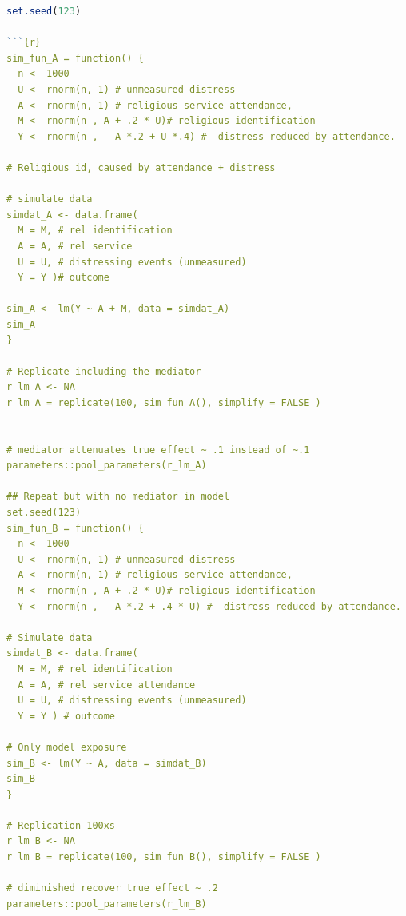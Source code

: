 \documentclass[]{interact}
\theoremstyle{plain}%
\theoremstyle{definition}
\theoremstyle{remark}
\begin{document}
\singlespace
\begin{lstlisting}[language=R]
set.seed(123)

```{r}
sim_fun_A = function() {
  n <- 1000
  U <- rnorm(n, 1) # unmeasured distress 
  A <- rnorm(n, 1) # religious service attendance,
  M <- rnorm(n , A + .2 * U)# religious identification
  Y <- rnorm(n , - A *.2 + U *.4) #  distress reduced by attendance.
  
# Religious id, caused by attendance + distress

# simulate data
simdat_A <- data.frame(
  M = M, # rel identification
  A = A, # rel service
  U = U, # distressing events (unmeasured)
  Y = Y )# outcome

sim_A <- lm(Y ~ A + M, data = simdat_A)
sim_A
}

# Replicate including the mediator
r_lm_A <- NA
r_lm_A = replicate(100, sim_fun_A(), simplify = FALSE )


# mediator attenuates true effect ~ .1 instead of ~.1
parameters::pool_parameters(r_lm_A)

## Repeat but with no mediator in model
set.seed(123)
sim_fun_B = function() {
  n <- 1000
  U <- rnorm(n, 1) # unmeasured distress 
  A <- rnorm(n, 1) # religious service attendance,
  M <- rnorm(n , A + .2 * U)# religious identification
  Y <- rnorm(n , - A *.2 + .4 * U) #  distress reduced by attendance.
  
# Simulate data
simdat_B <- data.frame(
  M = M, # rel identification
  A = A, # rel service attendance
  U = U, # distressing events (unmeasured)
  Y = Y ) # outcome

# Only model exposure
sim_B <- lm(Y ~ A, data = simdat_B)
sim_B
}

# Replication 100xs
r_lm_B <- NA
r_lm_B = replicate(100, sim_fun_B(), simplify = FALSE )

# diminished recover true effect ~ .2
parameters::pool_parameters(r_lm_B)


\end{lstlisting}
\end{document}
